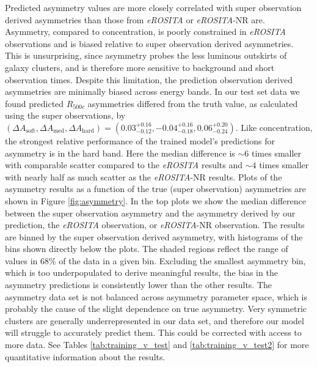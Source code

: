 Predicted asymmetry values are more closely correlated with super observation derived asymmetries than those from \textit{eROSITA} or \textit{eROSITA}-NR are. Asymmetry, compared to concentration, is poorly constrained in \textit{eROSITA} observations and is biased relative to super observation derived asymmetries. This is unsurprising, since asymmetry probes the less luminous outskirts of galaxy clusters, and is therefore more sensitive to background and short observation times. Despite this limitation, the prediction observation derived asymmetries are minimally biased across energy bands. In our test set data we found predicted $R_{500c}$ asymmetries differed from the truth value, as calculated using the super observations, by $(\Delta A_{\mathrm{soft}},\Delta A_{\mathrm{med}},\Delta A_{\mathrm{hard}}) = (0.03_{-0.12}^{+0.16}, -0.04_{-0.18}^{+0.16}, 0.06_{-0.24}^{+0.20})$. Like concentration, the strongest relative performance of the trained model's predictions for asymmetry is in the hard band. Here the median difference is $\sim6$ times smaller with comparable scatter compared to the \textit{eROSITA} results and $\sim4$ times smaller with nearly half as much scatter as the \textit{eROSITA}-NR results.  Plots of the asymmetry results as a function of the true (super observation) asymmetries are shown in Figure \ref{fig:asymmetry}. In the top plots we show the median difference between the super observation asymmetry and the asymmetry derived by our prediction, the \textit{eROSITA} observation, or \textit{eROSITA}-NR observation. The results are binned by the super observation derived asymmetry, with histograms of the bins shown directly below the plots. The shaded regions reflect the range of values in 68\% of the data in a given bin. Excluding the smallest asymmetry bin, which is too underpopulated to derive meaningful results, the bias in the asymmetry predictions is consistently lower than the other results. The asymmetry data set is not balanced across asymmetry parameter space, which is probably the cause of the slight dependence on true asymmetry. Very symmetric clusters are generally underrepresented in our data set, and therefore our model will struggle to accurately predict them. This could be corrected with access to more data. See Tables \ref{tab:training_v_test} and  \ref{tab:training_v_test2} for more quantitative information about the results.

